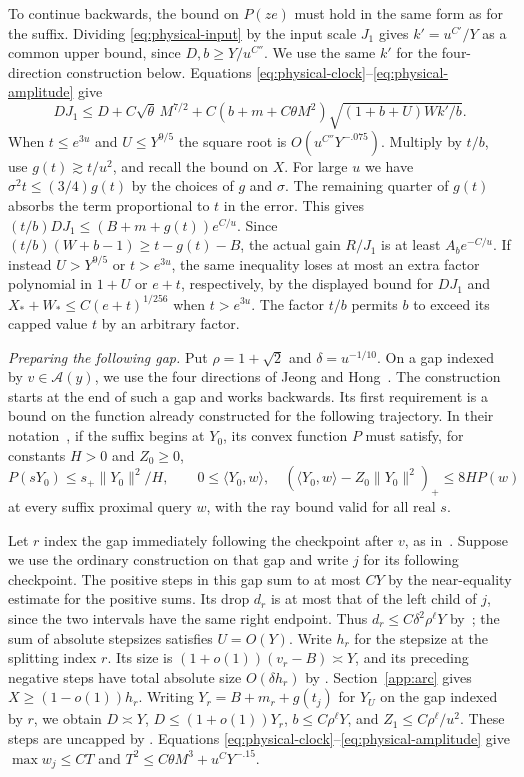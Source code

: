 \documentclass[11pt]{article}
\theoremstyle{definition}
\begin{document}
To continue backwards, the bound on \(P(ze)\) must hold in the same
form as for the suffix. Dividing \eqref{eq:physical-input} by the input
scale \(J_1\) gives \(k'=u^{C'}/Y\) as a common upper bound, since
\(D,b\ge Y/u^{C''}\). We use the same \(k'\) for the four-direction
construction below. Equations \eqref{eq:physical-clock}--\eqref{eq:physical-amplitude} give
\[
 DJ_1\le D+C\sqrt\theta\, M^{7/2}
       +C(b+m+C\theta M^2)\sqrt{(1+b+U)Wk'/b}.
\]
When $t\le e^{3u}$ and $U\le Y^{9/5}$ the square root is $O(u^{C''}Y^{-.075})$. Multiply by $t/b$, use $g(t)\gtrsim t/u^2$, and recall the bound on $X$. For large $u$ we have $\sigma^2t\le(3/4)g(t)$ by the choices of $g$ and $\sigma$. The remaining quarter of $g(t)$ absorbs the term proportional to $t$ in the error. This gives $(t/b)DJ_1\le (B+m+g(t))e^{C/u}$. Since $(t/b)(W+b-1)\ge t-g(t)-B$, the actual gain $R/J_1$ is at least $A_b e^{-C/u}$. If instead $U>Y^{9/5}$ or $t>e^{3u}$, the same inequality loses at most an extra factor polynomial in $1+U$ or $e+t$, respectively, by the displayed bound for $DJ_1$ and $X_*+W_*\le C(e+t)^{1/256}$ when $t>e^{3u}$. The factor $t/b$ permits $b$ to exceed its capped value $t$ by an arbitrary factor.

\smallskip\noindent\emph{Preparing the following gap.}
Put $\rho=1+\sqrt2$ and $\delta=u^{-1/10}$. On a gap indexed by $v\in\mathcal A(y)$, we use the four directions of Jeong and Hong~\cite[Lemmas~6.1--6.3]{JH}. The construction starts at the end of such a gap and works backwards.
Its first requirement is a bound on the function already constructed for the following trajectory. In their notation~\cite[(6.33)]{JH}, if the suffix begins at $Y_0$, its convex function $P$ must satisfy, for constants $H>0$ and $Z_0\ge0$,
\begin{equation}\label{eq:physical-interface}
 P(sY_0)\le s_+\|Y_0\|^2/H,\qquad
 0\le\langle Y_0,w\rangle,\quad
 (\langle Y_0,w\rangle-Z_0\|Y_0\|^2)_+\le 8H P(w)
\end{equation}
at every suffix proximal query $w$, with the ray bound valid for all real $s$.

Let $r$ index the gap immediately following the checkpoint after $v$, as in~\cite[(6.48)]{JH}. Suppose we use the ordinary construction on that gap and write $j$ for its following checkpoint. The positive steps in this gap sum to at most $CY$ by the near-equality estimate for the positive sums. Its drop $d_r$ is at most that of the left child of $j$, since the two intervals have the same right endpoint. Thus $d_r\le C\delta^2\rho^\ell Y$ by~\cite[(5.15), (6.47)]{JH}; the sum of absolute stepsizes satisfies $U=O(Y)$. Write \(h_r\) for the stepsize at the splitting index \(r\). Its size is $(1+o(1))(v_r-B)\asymp Y$, and its preceding negative steps have total absolute size $O(\delta h_r)$ by \cite[(5.16)]{JH}. Section~\ref{app:arc} gives $X\ge(1-o(1))h_r$. Writing $Y_r=B+m_r+g(t_j)$ for $Y_U$ on the gap indexed by $r$, we obtain $D\asymp Y$, $D\le(1+o(1))Y_r$, $b\le C\rho^\ell Y$, and $Z_1\le C\rho^\ell/u^2$. These steps are uncapped by \cite[(5.6)--(5.9), (6.46)--(6.49)]{JH}. Equations \eqref{eq:physical-clock}--\eqref{eq:physical-amplitude} give $\max w_j\le CT$ and $T^2\le C\theta M^3+u^C Y^{-.15}$.
\end{document}
